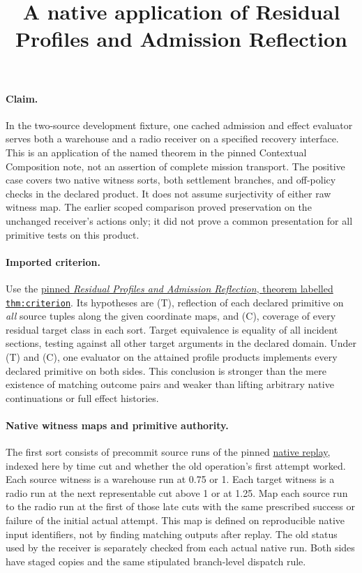 \documentclass[11pt]{article}
\title{A native application of Residual Profiles and Admission Reflection}
\date{}
\begin{document}
\maketitle

\paragraph{Claim.}
In the two-source development fixture, one cached admission and effect
evaluator serves both a warehouse and a radio receiver on a specified
recovery interface. This is an application of the named theorem in the
pinned Contextual Composition note, not an assertion of complete
mission transport. The positive case covers two native witness sorts,
both settlement branches, and off-policy checks in the declared
product. It does not assume surjectivity of either raw witness map.
The earlier scoped comparison proved preservation on the unchanged
receiver's actions only; it did not prove a common presentation for
all primitive tests on this product.

\paragraph{Imported criterion.}
Use the
\href{https://github.com/eternal-november/eos-research-programmes/blob/4359a8a1484498b9c46d8e58a0112448a1fba06b/projects/contextual-composition/feedback-and-concurrency/observable-covers/Residual_Profiles_and_Admission_Reflection.tex}
{pinned \emph{Residual Profiles and Admission Reflection}, theorem labelled \texttt{thm:criterion}}.
Its hypotheses are (T), reflection of each declared primitive on
\emph{all} source tuples along the given coordinate maps, and (C),
coverage of every residual target class in each sort. Target
equivalence is equality of all incident sections, testing against
all other target arguments in the declared domain. Under (T) and
(C), one evaluator on the attained profile products implements
every declared primitive on both sides. This conclusion is stronger
than the mere existence of matching outcome pairs and weaker than
lifting arbitrary native continuations or full effect histories.

\paragraph{Native witness maps and primitive authority.}
The first sort consists of precommit source runs of the pinned
\href{https://github.com/eternal-november/eos-research-programmes/pull/579}
{native replay}, indexed here by time cut and whether the old
operation's first attempt worked. Each source witness is a warehouse
run at 0.75 or 1. Each target witness is a radio run at the next
representable cut above 1 or at 1.25. Map each source run to the
radio run at the first of those late cuts with the same prescribed
success or failure of the initial actual attempt. This map is
defined on reproducible native input identifiers, not by finding
matching outputs after replay. The old status used by the receiver
is separately checked from each actual native run. Both sides have
staged copies and the same stipulated branch-level dispatch rule.
\end{document}
